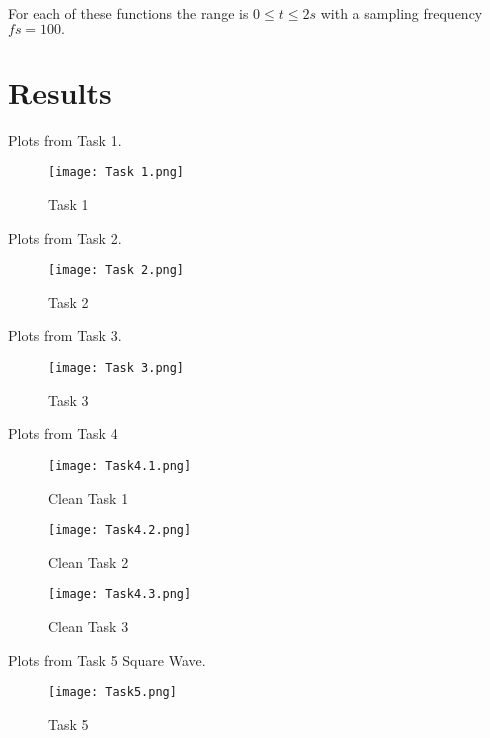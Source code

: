 \documentclass[12pt]{report}
\begin{document}
For each of these functions the range is $0 \leq t \leq 2s$ with a sampling frequency $fs = 100.$ \newpage

\section{Results}
Plots from Task 1.\newline 
\begin{figure}[h!]
    \centering
    \texttt{[image: Task 1.png]}
    \caption{Task 1 }
    \label{Task 1}
\end{figure}

Plots from Task 2.\newline 
\begin{figure}[h!]
    \centering
    \texttt{[image: Task 2.png]}
    \caption{Task 2}
    \label{Task 2}
\end{figure}

Plots from Task 3.\newline 
\begin{figure}[h!]
    \centering
    \texttt{[image: Task 3.png]}
    \caption{Task 3 }
    \label{Task 3}
\end{figure}

Plots from Task 4\newline 
\begin{figure}[h!]
    \centering
    \texttt{[image: Task4.1.png]}
    \caption{Clean Task 1 }
    \label{Task 4.1}
\end{figure}
\newpage
\begin{figure}[h!]
    \centering
    \texttt{[image: Task4.2.png]}
    \caption{Clean Task 2 }
    \label{Task 4.2}
\end{figure}
\begin{figure}[h!]
    \centering
    \texttt{[image: Task4.3.png]}
    \caption{Clean Task 3 }
    \label{Task 4.3}
\end{figure}
\newpage 
Plots from Task 5 Square Wave.
\begin{figure}[h!]
    \centering
    \texttt{[image: Task5.png]}
    \caption{Task 5 }
    \label{Task 5}
\end{figure}
\end{document}
